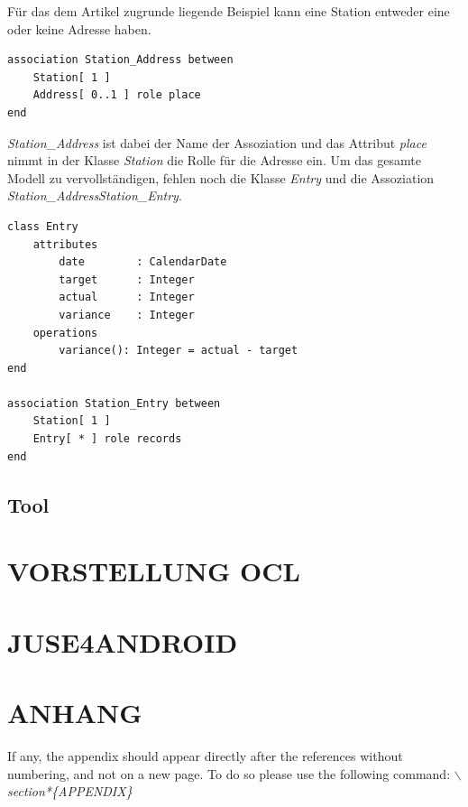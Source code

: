 \documentclass[a4paper,twoside]{article}
\begin{document}
Für das dem Artikel zugrunde liegende Beispiel kann eine Station entweder eine oder keine Adresse haben.

\begin{lstlisting}
association Station_Address between
	Station[ 1 ] 
	Address[ 0..1 ] role place
end
\end{lstlisting}

\textit{Station\_Address} ist dabei der Name der Assoziation und das Attribut \textit{place} nimmt in der Klasse \textit{Station} die Rolle für die Adresse ein. Um das gesamte Modell zu vervollständigen, fehlen noch die Klasse \textit{Entry} und die Assoziation \textit{Station\_Address}\textit{Station\_Entry}.

\begin{lstlisting}
class Entry
	attributes
		date		: CalendarDate
		target		: Integer
		actual		: Integer
		variance	: Integer
	operations
		variance(): Integer = actual - target	
end

association Station_Entry between
	Station[ 1 ] 
	Entry[ * ] role records
end
\end{lstlisting}

\subsection{Tool}

\section{\uppercase{Vorstellung OCL}}

\section{\uppercase{JUSE4Android}}

\vfill

{\small
}

\section*{\uppercase{Anhang}}

\noindent If any, the appendix should appear directly after the
references without numbering, and not on a new page. To do so please use the following command:
\textit{$\backslash$section*\{APPENDIX\}}


\vfill
\end{document}
